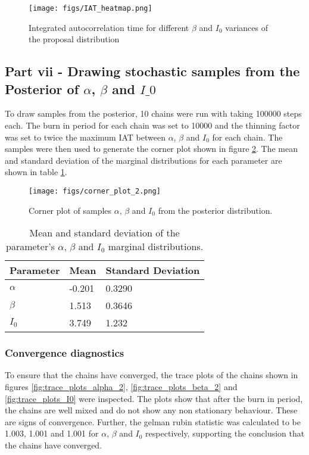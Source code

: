 \documentclass[11pt]{article}
\begin{document}
\begin{figure}[H]
    \centering
    \texttt{[image: figs/IAT\_heatmap.png]}
    \caption{Integrated autocorrelation time for different $\beta$ and $I_0$ variances of the proposal distribution}
    \label{fig:std_tuning_2}
\end{figure}
\subsection{Part vii - Drawing stochastic samples from the Posterior of $\alpha$, $\beta$ and $I\_0$}
To draw samples from the posterior, 10 chains were run with taking 100000 steps each. The burn in period for each chain was set to 10000 and the thinning factor was set to twice the maximum IAT between $\alpha$, $\beta$ and $I_0$ for each chain. The samples were then used to generate the corner plot shown in figure \ref{fig:corner_plot}. The mean and standard deviation of the marginal distributions for each parameter are shown in table \ref{tab:mean_std_2}.

\begin{figure}[H]
    \centering
    \texttt{[image: figs/corner\_plot\_2.png]}
    \caption{Corner plot of samples $\alpha$, $\beta$ and $I_0$ from the posterior distribution.}
    \label{fig:corner_plot}
\end{figure}

\begin{table}[H]
    \centering
    \begin{tabular}{@{}lll@{}}
    \toprule
    Parameter & Mean & Standard Deviation \\ \midrule
    $\alpha$  & -0.201 & 0.3290 \\
    $\beta$   & 1.513 & 0.3646 \\
    $I_0$    & 3.749 & 1.232 \\ \bottomrule
    \end{tabular}
    \caption{Mean and standard deviation of the parameter's $\alpha$, $\beta$ and $I_0$ marginal distributions.}
    \label{tab:mean_std_2}
\end{table}
\subsubsection{Convergence diagnostics}
To ensure that the chains have converged, the trace plots of the chains shown in figures \ref{fig:trace_plots_alpha_2}, \ref{fig:trace_plots_beta_2} and \ref{fig:trace_plots_I0} were inspected. The plots show that after the burn in period, the chains are well mixed and do not show any non stationary behaviour. These are signs of convergence. Further, the gelman rubin statistic was calculated to be 1.003, 1.001 and 1.001 for $\alpha$, $\beta$ and $I_0$ respectively, supporting the conclusion that the chains have converged.
\end{document}
